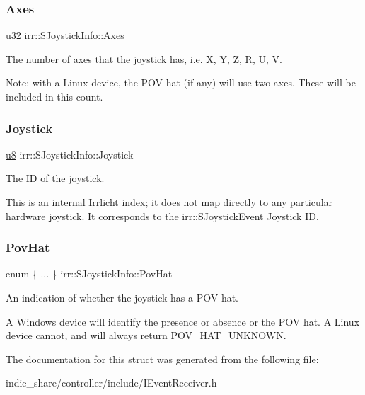 \subsubsection{\texorpdfstring{Axes}{Axes}}
{\footnotesize\ttfamily \hyperlink{namespaceirr_a0416a53257075833e7002efd0a18e804}{u32} irr\+::\+S\+Joystick\+Info\+::\+Axes}



The number of axes that the joystick has, i.\+e. X, Y, Z, R, U, V. 

Note\+: with a Linux device, the P\+OV hat (if any) will use two axes. These will be included in this count. \mbox{\label{structirr_1_1SJoystickInfo_a691ed1bcdbf4ab3b30a4e9ed648c6d9d}} 
\subsubsection{\texorpdfstring{Joystick}{Joystick}}
{\footnotesize\ttfamily \hyperlink{namespaceirr_a646874f69af8ff87fc10201b0254a761}{u8} irr\+::\+S\+Joystick\+Info\+::\+Joystick}



The ID of the joystick. 

This is an internal Irrlicht index; it does not map directly to any particular hardware joystick. It corresponds to the irr\+::\+S\+Joystick\+Event Joystick ID. \mbox{\label{structirr_1_1SJoystickInfo_a2abf9d4741731c29fe4d9d64f7909d1e}} 
\subsubsection{\texorpdfstring{Pov\+Hat}{PovHat}}
{\footnotesize\ttfamily enum \{ ... \}   irr\+::\+S\+Joystick\+Info\+::\+Pov\+Hat}



An indication of whether the joystick has a P\+OV hat. 

A Windows device will identify the presence or absence or the P\+OV hat. A Linux device cannot, and will always return P\+O\+V\+\_\+\+H\+A\+T\+\_\+\+U\+N\+K\+N\+O\+WN. 

The documentation for this struct was generated from the following file\+:\begin{DoxyCompactItemize}
\item 
indie\+\_\+share/controller/include/I\+Event\+Receiver.\+h\end{DoxyCompactItemize}

